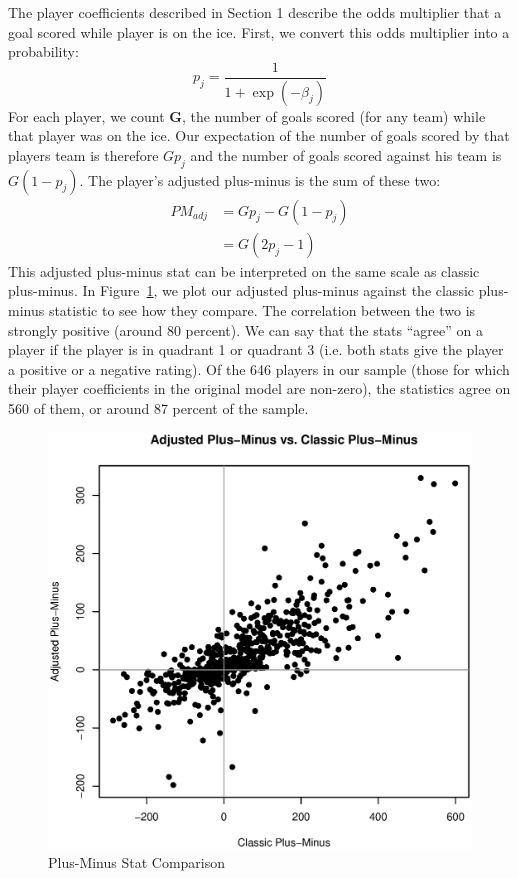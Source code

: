 \documentclass[11pt, fleqn]{article}
\begin{document}
The player coefficients described in Section 1 describe the odds multiplier that a goal scored while player is on the ice. First, we convert this odds multiplier into a probability:
\[ p_j = \frac{1}{1+\exp \left(-\beta_j\right)} \]
For each player, we count \textbf{G}, the number of goals scored (for any team) while that player was on the ice. Our expectation of the number of goals scored by that players team is therefore $G p_j$ and the number of goals scored against his team is $G (1-p_j)$. The player's adjusted plus-minus is the sum of these two:
\begin{align*} 
PM_{adj} & = G p_j - G (1-p_j) \\
 & = G (2 p_j - 1)
\end{align*}
This adjusted plus-minus stat can be interpreted on the same scale as classic plus-minus. In Figure~\ref{fig:pm_compare}, we plot our adjusted plus-minus against the classic plus-minus statistic to see how they compare. The correlation between the two is strongly positive (around 80 percent). We can say that the stats ``agree'' on a player if the player is in quadrant 1 or quadrant 3 (i.e. both stats give the player a positive or a negative rating). Of the 646 players in our sample (those for which their player coefficients in the original model are non-zero), the statistics agree on 560 of them, or around 87 percent of the sample.

\begin{figure}[!htb]
  \centering
  \includegraphics[scale=.5]{pm_compare.eps}
  \caption{Plus-Minus Stat Comparison}
  \label{fig:pm_compare}
\end{figure}
\end{document}
